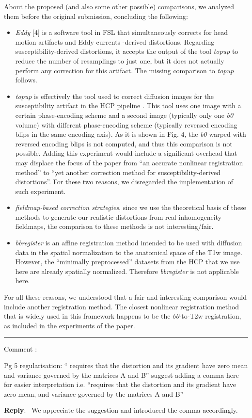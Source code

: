 \documentclass[9pt]{memoir}
\newcounter{reviewpoint}
\newenvironment{reviewpoint}%
{\refstepcounter{reviewpoint}\par\medskip\vspace{3ex}\hrule\vspace{1.5ex}\par\noindent%
   {\fontseries{b}\selectfont Comment \arabic{reviewpoint}:}
   \begingroup%
   \color{black!60}
   \fontshape{it}\selectfont %

}
{\endgroup\label{com:\thereviewpoint}\par\medskip}
\newcommand{\reply}{\par\fontshape{n}\selectfont \noindent \textbf{Reply}:\ }
\begin{document}
{About the proposed (and also some other possible) comparisons, we analyzed them before
  the original submission, concluding the following:
\begin{itemize}
\item \emph{Eddy} [4] is a software tool in FSL that simultaneously corrects for
    head motion artifacts and Eddy currents -derived distortions.
  Regarding susceptibility-derived distortions, it accepts the output of the tool 
    \emph{topup} to reduce the number of resamplings to just one, but it does not
    actually perform any correction for this artifact.
  The missing comparison to \emph{topup} follows.
\item \emph{topup} is effectively the tool used to correct diffusion images for the
  susceptibility artifact in the HCP pipeline \citep{glasser_minimal_2013}.
  This tool uses one image with a certain phase-encoding scheme and a second image
    (typically only one \emph{b0} volume) with different phase-encoding scheme (typically
    reversed encoding blips in the same encoding axis).
  As it is shown in Fig. 4, the \emph{b0} warped with reversed encoding blips is not
    computed, and thus this comparison is not possible.
  Adding this experiment would include a significant overhead that may displace the focus
    of the paper from ``an accurate nonlinear registration method'' to ``yet another 
    correction method for susceptibility-derived distortions''.
  For these two reasons, we disregarded the implementation of such experiment.
\item \emph{fieldmap-based correction strategies}, since we use the theoretical basis of these
  methods to generate our realistic distortions from real inhomogeneity fieldmaps, 
  the comparison to these methods is not interesting/fair.
\item \emph{bbregister} is an affine registration method intended to be used with diffusion
  data in the spatial normalization to the anatomical space of the T1w image.
  However, the ``minimally preprocessed'' datasets from the HCP that we use here are already
  spatially normalized.
  Therefore \emph{bbregister} is not applicable here.
\end{itemize}
For all these reasons, we understood that a fair and interesting comparison would include
  another registration method.
The closest nonlinear registration method that is widely used in this framework happens
  to be the \emph{b0}-to-T2w registration, as included in the experiments of the paper.
}

\begin{reviewpoint}
Pg 5 regularisation: `` requires that the distortion and its gradient have zero mean and variance governed by the matrices A and B'' suggest adding a comma here for easier interpretation i.e. ``requires that the distortion and its gradient have zero mean, and variance governed by the matrices A and B''
\end{reviewpoint}
\reply{%
We appreciate the suggestion and introduced the comma accordingly.
}
\end{document}

